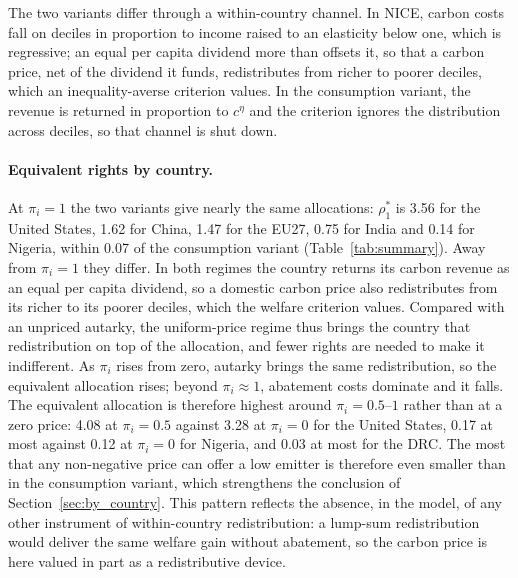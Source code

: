 \documentclass[12pt,english]{article}
\theoremstyle{remark}
\begin{document}
The two variants differ through a within-country channel. In NICE, carbon costs fall on deciles in proportion to income raised to an elasticity below one, which is regressive; an equal per capita dividend more than offsets it, so that a carbon price, net of the dividend it funds, redistributes from richer to poorer deciles, which an inequality-averse criterion values. In the consumption variant, the revenue is returned in proportion to $c^{\eta}$ and the criterion ignores the distribution across deciles, so that channel is shut down.

\paragraph{Equivalent rights by country.} At $\pi_i=1$ the two variants give nearly the same allocations: $\rho^*_1$ is 3.56 for the United States, 1.62 for China, 1.47 for the EU27, 0.75 for India and 0.14 for Nigeria, within 0.07 of the consumption variant (Table~\ref{tab:summary}). Away from $\pi_i=1$ they differ. In both regimes the country returns its carbon revenue as an equal per capita dividend, so a domestic carbon price also redistributes from its richer to its poorer deciles, which the welfare criterion values. Compared with an unpriced autarky, the uniform-price regime thus brings the country that redistribution on top of the allocation, and fewer rights are needed to make it indifferent. As $\pi_i$ rises from zero, autarky brings the same redistribution, so the equivalent allocation rises; beyond $\pi_i\approx1$, abatement costs dominate and it falls. The equivalent allocation is therefore highest around $\pi_i=0.5$--$1$ rather than at a zero price: 4.08 at $\pi_i=0.5$ against 3.28 at $\pi_i=0$ for the United States, 0.17 at most against 0.12 at $\pi_i=0$ for Nigeria, and 0.03 at most for the DRC. The most that any non-negative price can offer a low emitter is therefore even smaller than in the consumption variant, which strengthens the conclusion of Section~\ref{sec:by_country}. This pattern reflects the absence, in the model, of any other instrument of within-country redistribution: a lump-sum redistribution would deliver the same welfare gain without abatement, so the carbon price is here valued in part as a redistributive device. %
\end{document}
